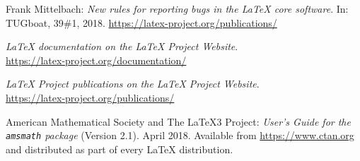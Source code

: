 \documentclass{ltnews}
\begin{document}
      

\begin{thebibliography}{9}
  
 Frank Mittelbach:
  \emph{New rules for reporting bugs in the \LaTeX{} core software}.  
  In: TUGboat, 39\#1, 2018.
  \url{https://latex-project.org/publications/}

  \emph{\LaTeX{} documentation on the \LaTeX{} Project Website}.\\  
  \url{https://latex-project.org/documentation/}

  \emph{\LaTeX{} Project publications on the \LaTeX{} Project Website}.\\
  \url{https://latex-project.org/publications/}

 American Mathematical Society and The \LaTeX3 Project:
  \emph{User's Guide for the \texttt{amsmath} package} (Version 2.1).  
  April 2018.
  Available from
  \url{https://www.ctan.org}
  and distributed as part of every \LaTeX{} distribution.

\end{thebibliography}
\end{document}
